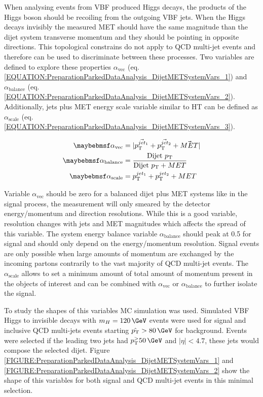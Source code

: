 When analysing events from \gls{VBF} produced Higgs decays, the products of the Higgs boson should be recoiling from the outgoing \gls{VBF} jets. When the Higgs decays invisibly the measured \gls{MET} should have the same magnitude than the dijet system transverse momentum and they should be pointing in opposite directions. This topological constrains do not apply to \gls{QCD} multi-jet events and therefore can be used to discriminate between these processes. Two variables are defined to explore these properties $\alpha_{\text{vec}}$ (eq. \ref{EQUATION:PreparationParkedDataAnalysis_DijetMETSystemVars_1}) and $\alpha_{\text{balance}}$ (eq. \ref{EQUATION:PreparationParkedDataAnalysis_DijetMETSystemVars_2}). Additionally, jets plus \gls{MET} energy scale variable similar to \gls{HT} can be defined as $\alpha_{\text{scale}}$ (eq. \ref{EQUATION:PreparationParkedDataAnalysis_DijetMETSystemVars_3}).

\begin{align}
\alpha_{\text{vec}}     &= |\vec{\pt^{jet_1}} + \vec{\pt^{jet_2}} + \vec{MET}|
\label{EQUATION:PreparationParkedDataAnalysis_DijetMETSystemVars_1} \\
\alpha_{\text{balance}} &= \frac{\text{Dijet } \pt}{\text{Dijet } \pt + MET} 
\label{EQUATION:PreparationParkedDataAnalysis_DijetMETSystemVars_2} \\
\alpha_{\text{scale}}   &= \pt^{jet_1} + \pt^{jet_2} + MET 
\label{EQUATION:PreparationParkedDataAnalysis_DijetMETSystemVars_3} \\
\end{align}

Variable $\alpha_{\text{vec}}$ should be zero for a balanced dijet plus \gls{MET} systems like in the signal process, the measurement will only smeared by the detector energy/momentum and direction resolutions. While this is a good variable, resolution changes with jets and \gls{MET} magnitudes which affects the spread of this variable. The system energy balance variable $\alpha_{\text{balance}}$ should peak at 0.5 for signal and should only depend on the energy/momentum resolution. Signal events are only possible when large amounts of momentum are exchanged by the incoming partons contrarily to the vast majority of \gls{QCD} multi-jet events. The $\alpha_{\text{scale}}$ allows to set a minimum amount of total amount of momentum present in the objects of interest and can be combined with $\alpha_{\text{vec}}$ or $\alpha_{\text{balance}}$ to further isolate the signal.

To study the shapes of this variables \gls{MC} simulation was used. Simulated \gls{VBF} Higgs to invisible decays with $m_H=120\,\GeV$ events were used for signal and inclusive \gls{QCD} multi-jets events starting $\hat{\pt}>80\,\GeV$ for background. Events were selected if the leading two jets had $\pt^>50\,\GeV$ and $|\eta|<4.7$, these jets would compose the selected dijet. Figure \ref{FIGURE:PreparationParkedDataAnalysis_DijetMETSystemVars_1} and \ref{FIGURE:PreparationParkedDataAnalysis_DijetMETSystemVars_2} show the shape of this variables for both signal and \gls{QCD} multi-jet events in this minimal selection.

